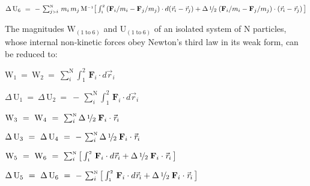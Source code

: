 \documentclass[10pt]{article}
\newcommand{\med}{\raise.5ex\hbox{$\scriptstyle 1$}\kern-.15em/\kern-.09em\lower.25ex\hbox{$\scriptstyle 2$}}
\begin{document}
\par \bigskip\smallskip \noindent $\Delta \, {\mathrm{U}}_6 ~=~ - \, \sum_{j{\scriptscriptstyle >}i}^{\scriptscriptstyle{\mathrm{N}}} \, m_i \, m_j \, {\mathrm{M}}^{\scriptscriptstyle -1} \big [ \int_{\scriptscriptstyle 1}^{\scriptscriptstyle 2} \, ({\mathbf{F}}_i / m_i - {\mathbf{F}}_j / m_j) \cdot d({\vec{\mathit{r}}_{i}} - {\vec{\mathit{r}}_{j}}) + \Delta \, \med \; ({\mathbf{F}}_i / m_i - {\mathbf{F}}_j / m_j) \cdot ({\vec{\mathit{r}}_{i}} - {\vec{\mathit{r}}_{j}}) \, \big ]$

\par \bigskip\bigskip \noindent The magnitudes ${\mathrm{W}}_{(1\;{\mathrm{to}}\;6)}$ and ${\mathrm{U}}_{(1\;{\mathrm{to}}\;6)}$ of an isolated system of N particles, whose internal non-kinetic forces obey Newton's third law in its weak form, can be reduced to:

\par \bigskip\bigskip \noindent ${\mathrm{W}}_1 ~=~ {\mathrm{W}}_2 ~=~ \sum_i^{\scriptscriptstyle{\mathrm{N}}} \int_{\scriptscriptstyle 1}^{\scriptscriptstyle 2} \, {\mathbf{F}}_i \cdot d{\vec{\mathit{r}}_{i}}$

\par \bigskip\smallskip \noindent $\Delta \, {\mathrm{U}}_1 ~=~ \Delta \, {\mathrm{U}}_2 ~=~ - \, \sum_i^{\scriptscriptstyle{\mathrm{N}}} \int_{\scriptscriptstyle 1}^{\scriptscriptstyle 2} \, {\mathbf{F}}_i \cdot d{\vec{\mathit{r}}_{i}}$

\par \bigskip\bigskip \noindent ${\mathrm{W}}_3 ~=~ {\mathrm{W}}_4 ~=~ \sum_i^{\scriptscriptstyle{\mathrm{N}}} \Delta \, \med \; {\mathbf{F}}_i \cdot {\vec{\mathit{r}}_{i}}$

\par \bigskip\smallskip \noindent $\Delta \, {\mathrm{U}}_3 ~=~ \Delta \, {\mathrm{U}}_4 ~=~ - \, \sum_i^{\scriptscriptstyle{\mathrm{N}}} \Delta \, \med \; {\mathbf{F}}_i \cdot {\vec{\mathit{r}}_{i}}$

\par \bigskip\bigskip \noindent ${\mathrm{W}}_5 ~=~ {\mathrm{W}}_6 ~=~ \sum_i^{\scriptscriptstyle{\mathrm{N}}} \big [ \int_{\scriptscriptstyle 1}^{\scriptscriptstyle 2} \, {\mathbf{F}}_i \cdot d{\vec{\mathit{r}}_{i}} + \Delta \, \med \; {\mathbf{F}}_i \cdot {\vec{\mathit{r}}_{i}} \, \big ]$

\par \bigskip\smallskip \noindent $\Delta \, {\mathrm{U}}_5 ~=~ \Delta \, {\mathrm{U}}_6 ~=~ - \, \sum_i^{\scriptscriptstyle{\mathrm{N}}} \big [ \int_{\scriptscriptstyle 1}^{\scriptscriptstyle 2} \, {\mathbf{F}}_i \cdot d{\vec{\mathit{r}}_{i}} + \Delta \, \med \; {\mathbf{F}}_i \cdot {\vec{\mathit{r}}_{i}} \, \big ]$
\end{document}
